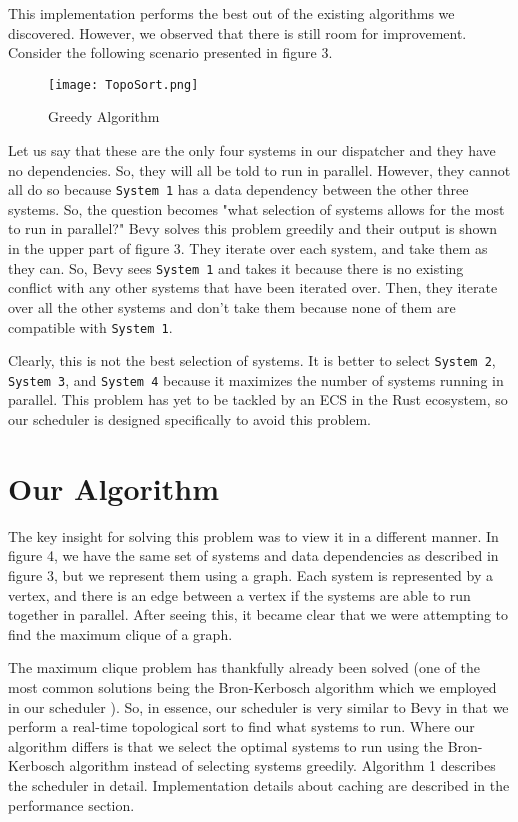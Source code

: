 \documentclass[conference]{IEEEtran}
\begin{document}
This implementation performs the best out of the existing algorithms we discovered. However, we observed that there is still room for improvement. Consider the following scenario presented in figure 3.

\begin{figure}
    \begin{center}
    \centerline{\texttt{[image: TopoSort.png]}}
    \caption[test]{Greedy Algorithm}
    \label{ECS Archetype}
    \end{center}
\end{figure}

Let us say that these are the only four systems in our dispatcher and they have no dependencies. So, they will all be told to run in parallel. However, they cannot all do so because \verb|System 1| has a data dependency between the other three systems. So, the question becomes "what selection of systems allows for the most to run in parallel?" Bevy solves this problem greedily and their output is shown in the upper part of figure 3. They iterate over each system, and take them as they can. So, Bevy sees \verb|System 1| and takes it because there is no existing conflict with any other systems that have been iterated over. Then, they iterate over all the other systems and don't take them because none of them are compatible with \verb|System 1|.

Clearly, this is not the best selection of systems. It is better to select \verb|System 2|,  \verb|System 3|, and  \verb|System 4| because it maximizes the number of systems running in parallel. This problem has yet to be tackled by an ECS in the Rust ecosystem, so our scheduler is designed specifically to avoid this problem.

\section{Our Algorithm}

The key insight for solving this problem was to view it in a different manner. In figure 4, we have the same set of systems and data dependencies as described in figure 3, but we represent them using a graph. Each system is represented by a vertex, and there is an edge between a vertex if the systems are able to run together in parallel. After seeing this, it became clear that we were attempting to find the maximum clique of a graph.

The maximum clique problem has thankfully already been solved (one of the most common solutions being the Bron-Kerbosch algorithm which we employed in our scheduler \cite{bron_kerbosch}). So, in essence, our scheduler is very similar to Bevy in that we perform a real-time topological sort to find what systems to run. Where our algorithm differs is that we select the optimal systems to run using the Bron-Kerbosch algorithm instead of selecting systems greedily. Algorithm 1 describes the scheduler in detail. Implementation details about caching are described in the performance section.
\end{document}
